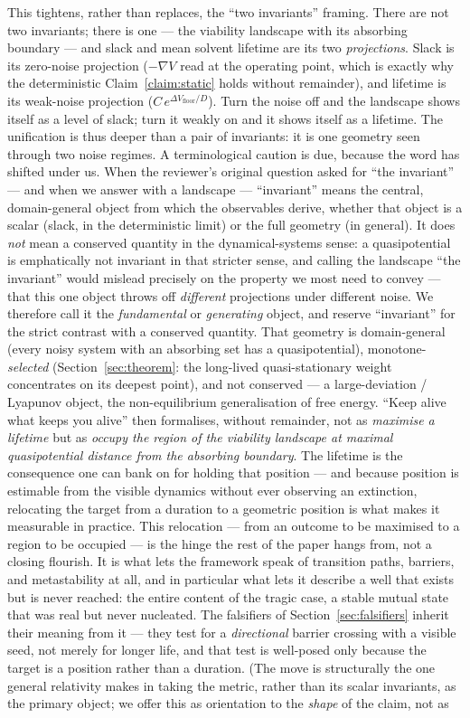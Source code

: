 \documentclass[11pt]{article}
\theoremstyle{plain}
\theoremstyle{definition}
\begin{document}
This tightens, rather than replaces, the ``two invariants'' framing. There are not two invariants; there is one --- the viability landscape with its absorbing boundary --- and slack and mean solvent lifetime are its two \emph{projections}. Slack is its zero-noise projection ($-\nabla V$ read at the operating point, which is exactly why the deterministic Claim~\ref{claim:static} holds without remainder), and lifetime is its weak-noise projection ($C\,e^{\Delta V_{\text{floor}}/D}$). Turn the noise off and the landscape shows itself as a level of slack; turn it weakly on and it shows itself as a lifetime. The unification is thus deeper than a pair of invariants: it is one geometry seen through two noise regimes. A terminological caution is due, because the word has shifted under us. When the reviewer's original question asked for ``the invariant'' --- and when we answer with a landscape --- ``invariant'' means the central, domain-general object from which the observables derive, whether that object is a scalar (slack, in the deterministic limit) or the full geometry (in general). It does \emph{not} mean a conserved quantity in the dynamical-systems sense: a quasipotential is emphatically not invariant in that stricter sense, and calling the landscape ``the invariant'' would mislead precisely on the property we most need to convey --- that this one object throws off \emph{different} projections under different noise. We therefore call it the \emph{fundamental} or \emph{generating} object, and reserve ``invariant'' for the strict contrast with a conserved quantity. That geometry is domain-general (every noisy system with an absorbing set has a quasipotential), monotone-\emph{selected} (Section~\ref{sec:theorem}: the long-lived quasi-stationary weight concentrates on its deepest point), and not conserved --- a large-deviation / Lyapunov object, the non-equilibrium generalisation of free energy. ``Keep alive what keeps you alive'' then formalises, without remainder, not as \emph{maximise a lifetime} but as \emph{occupy the region of the viability landscape at maximal quasipotential distance from the absorbing boundary}. The lifetime is the consequence one can bank on for holding that position --- and because position is estimable from the visible dynamics without ever observing an extinction, relocating the target from a duration to a geometric position is what makes it measurable in practice. This relocation --- from an outcome to be maximised to a region to be occupied --- is the hinge the rest of the paper hangs from, not a closing flourish. It is what lets the framework speak of transition paths, barriers, and metastability at all, and in particular what lets it describe a well that exists but is never reached: the entire content of the tragic case, a stable mutual state that was real but never nucleated. The falsifiers of Section~\ref{sec:falsifiers} inherit their meaning from it --- they test for a \emph{directional} barrier crossing with a visible seed, not merely for longer life, and that test is well-posed only because the target is a position rather than a duration. (The move is structurally the one general relativity makes in taking the metric, rather than its scalar invariants, as the primary object; we offer this as orientation to the \emph{shape} of the claim, not as 
\end{document}
